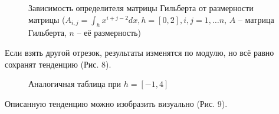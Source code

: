 ﻿\documentclass[a4paper, 12pt]{article}
\begin{document}
\begin{figure}[h!]
    \noindent{}
    \caption{Зависимость определителя матрицы Гильберта от размерности матрицы ($A_{i,j} =\int_h x^{i+j-2} dx,  h=[0,2], i,j=1,\dots n$, $A$ -- матрица Гильберта, $n$ -- её размерность)}
    \label{figCurves}
\end{figure}

Если взять другой отрезок, результаты изменятся по модулю, но всё равно сохранят тенденцию (Рис. 8).
 \begin{figure}[h!]
    \noindent{}
    \caption{Аналогичная таблица при $h=[-1,4]$}
    \label{figCurves}
\end{figure}
Описанную тенденцию можно изобразить визуально (Рис. 9).
\end{document}
